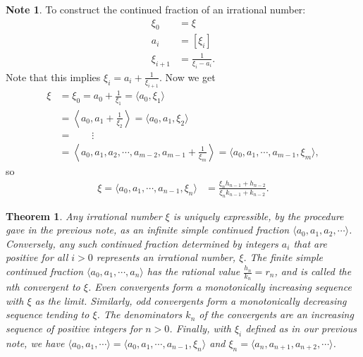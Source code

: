 \documentclass{amsart}
\newtheorem{theorem}{Theorem}
\theoremstyle{definition}
\newtheorem*{note*}{Note}
\begin{document}
\begin{note*}
  To construct the continued fraction of an irrational number:
  \begin{align*}
    \xi_0 &= \xi \\
    a_i &= [\xi_i] \\
    \xi_{i+1} &= \frac{1}{\xi_i - a_i}.
  \end{align*}
  Note that this implies $\xi_i = a_i + \frac{1}{\xi_{i+1}}$.
  Now we get
  \begin{align*}
    \xi &= \xi_0 = a_0 + \frac{1}{\xi_1} = \langle a_0, \xi_1 \rangle \\
        &= \left \langle a_0, a_1 + \frac{1}{\xi_2} \right \rangle
           = \langle a_0, a_1, \xi_2 \rangle \\
        &= \qquad \vdots \\
        &= \left \langle 
    a_0, a_1, a_2, \cdots, a_{m-2}, a_{m-1} + \frac{1}{\xi_m} 
           \right \rangle 
           = \langle a_0, a_1, \cdots, a_{m-1}, \xi_m \rangle,
  \end{align*}
  so 
  \begin{align*}
    \xi = \langle a_0, a_1, \cdots, a_{n-1}, \xi_n \rangle
    &= \frac{\xi_n h_{n-1} + h_{n-2}}{\xi_n k_{n-1} + k_{n-2}}.
  \end{align*}
\end{note*}

\begin{theorem}
  Any irrational number $\xi$ is uniquely expressible, 
  by the procedure gave in the previous note, as an infinite
  simple continued fraction
  $\langle a_0, a_1, a_2, \cdots \rangle$.
  Conversely, any such continued fraction determined by integers
  $a_i$ that are positive for all $i > 0$ represents an 
  irrational number, $\xi$.
  The finite simple continued fraction 
  $\langle a_0, a_1, \cdots, a_n \rangle$ has the rational value
  $\frac{h_n}{k_n} = r_n$, and is called the nth convergent to 
  $\xi$.
  Even convergents form a monotonically increasing sequence with
  $\xi$ as the limit.
  Similarly, odd convergents form a monotonically decreasing sequence
  tending to $\xi$.
  The denominators $k_n$ of the convergents are an increasing
  sequence of positive integers for $n > 0$.
  Finally, with $\xi_i$ defined as in our previous note,
  we have 
  $\langle a_0, a_1, \cdots \rangle 
  = \langle a_0, a_1, \cdots, a_{n-1}, \xi_n \rangle$
  and 
  $\xi_n = \langle a_n, a_{n+1}, a_{n+2}, \cdots \rangle$.
\end{theorem}
\end{document}
